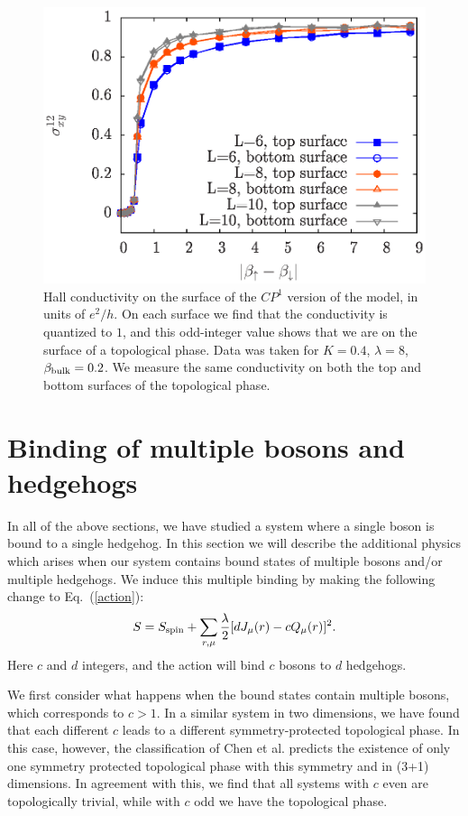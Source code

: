\documentclass[prb,twocolumn]{revtex4-1}
\begin{document}
\begin{figure}
\includegraphics[angle=-90,width=0.9\linewidth]{figures/cp1hall.eps}
\caption{Hall conductivity on the surface of the $CP^1$ version of the model, in units of $e^2/h$. On each surface we find that the conductivity is quantized to $1$, and this odd-integer value shows that we are on the surface of a topological phase. Data was taken for $K=0.4$, $\lambda=8$, $\beta_{\rm bulk}=0.2$. We measure the same conductivity on both the top and bottom surfaces of the topological phase.}
\label{cp1hall}
\end{figure}

\section{Binding of multiple bosons and hedgehogs}
\label{section::multiple}

In all of the above sections, we have studied a system where a single boson is bound to a single hedgehog. In this section we will describe the additional physics which arises when our system contains bound states of multiple bosons and/or multiple hedgehogs. We induce this multiple binding by making the following change to Eq.~(\ref{action}):
\begin{equation}
S=S_{\rm spin}+\sum_{r,\mu} \frac{\lambda}{2}[ dJ_\mu(r)- cQ_\mu(r)]^2.
\label{cdbind}
\end{equation}
Here $c$ and $d$ integers, and the action will bind $c$ bosons to $d$ hedgehogs. 

We first consider what happens when the bound states contain multiple bosons, which corresponds to $c>1$. In a similar system in two dimensions, we have found that each different $c$ leads to a different symmetry-protected topological phase.\cite{FQHE} In this case, however, the classification of Chen et al.\cite{WenScience,*WenPRB} predicts the existence of only one symmetry protected topological phase with this symmetry and in (3+1) dimensions. In agreement with this, we find that all systems with $c$ even are topologically trivial, while with $c$ odd we have the topological phase. 
\end{document}
